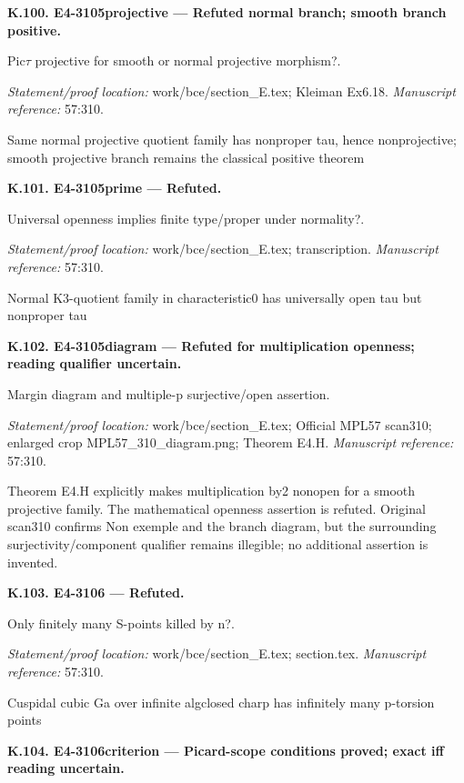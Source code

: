 \par\medskip\noindent\textbf{K.100. E4-3105projective --- Refuted normal branch; smooth branch positive.}\par
Pic\ensuremath{\tau} projective for smooth or normal projective morphism?.
\par\emph{Statement/proof location:} work/bce/section\_E.tex; Kleiman Ex6.18.
\emph{Manuscript reference:} 57:310.
\par Same normal projective quotient family has nonproper tau, hence nonprojective; smooth projective branch remains the classical positive theorem
\par\medskip\noindent\textbf{K.101. E4-3105prime --- Refuted.}\par
Universal openness implies finite type/proper under normality?.
\par\emph{Statement/proof location:} work/bce/section\_E.tex; transcription.
\emph{Manuscript reference:} 57:310.
\par Normal K3-quotient family in characteristic0 has universally open tau but nonproper tau
\par\medskip\noindent\textbf{K.102. E4-3105diagram --- Refuted for multiplication openness; reading qualifier uncertain.}\par
Margin diagram and multiple-p surjective/open assertion.
\par\emph{Statement/proof location:} work/bce/section\_E.tex; Official MPL57 scan310; enlarged crop MPL57\_310\_diagram.png; Theorem E4.H.
\emph{Manuscript reference:} 57:310.
\par Theorem E4.H explicitly makes multiplication by2 nonopen for a smooth projective family. The mathematical openness assertion is refuted. Original scan310 confirms Non exemple and the branch diagram, but the surrounding surjectivity/component qualifier remains illegible; no additional assertion is invented.
\par\medskip\noindent\textbf{K.103. E4-3106 --- Refuted.}\par
Only finitely many S-points killed by n?.
\par\emph{Statement/proof location:} work/bce/section\_E.tex; section.tex.
\emph{Manuscript reference:} 57:310.
\par Cuspidal cubic Ga over infinite algclosed charp has infinitely many p-torsion points
\par\medskip\noindent\textbf{K.104. E4-3106criterion --- Picard-scope conditions proved; exact iff reading uncertain.}\par
